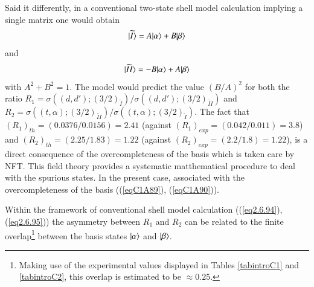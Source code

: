 Said it differently, in a conventional two-state shell model calculation implying a single matrix one would obtain
  \begin{align}\label{eq2.6.94} 
|{\widetilde I} \rangle=A|{\alpha} \rangle+B|{\beta} \rangle
\end{align} 
and
  \begin{align}\label{eq2.6.95} 
|{\widetilde {II}} \rangle=-B|{\alpha} \rangle+A|{\beta} \rangle
\end{align} 
with $A^2+B^2=1$. The model would predict the value $(B/A)^2$ for both the ratio $R_1=\sigma((d,d');(3/2)_{\widetilde I})/\sigma((d,d');(3/2)_{\widetilde {II}})$ and $R_2=\sigma((t,\alpha);(3/2)_{\widetilde {II}})/\sigma((t,\alpha);(3/2)_{\widetilde {I}})$. The fact that $(R_1)_{th}=(0.0376/0.0156)=2.41$ (against $(R_1)_{exp}=(0.042/0.011)=3.8$) and $(R_2)_{th}=(2.25/1.83)=1.22$ (against $(R_2)_{exp}=(2.2/1.8)=1.22$), is a direct consequence of the overcompleteness of the basis which is taken care by NFT. This field theory provides a systematic matthematical procedure to deal with the spurious states. In the present case, associated with the overcompleteness of the basis ((\ref{eqC1A89}), (\ref{eqC1A90})).

Within the framework of conventional shell model calculation ((\ref{eq2.6.94}), (\ref{eq2.6.95})) the asymmetry between $R_1$ and $R_2$ can be related to the finite overlap\footnote{Making use of the experimental values displayed in Tables \ref{tabintroC1} and  \ref{tabintroC2}, this overlap is estimated to be $\approx0.25$.} between the basis states $|{\alpha} \rangle$ and $|{\beta} \rangle$.

